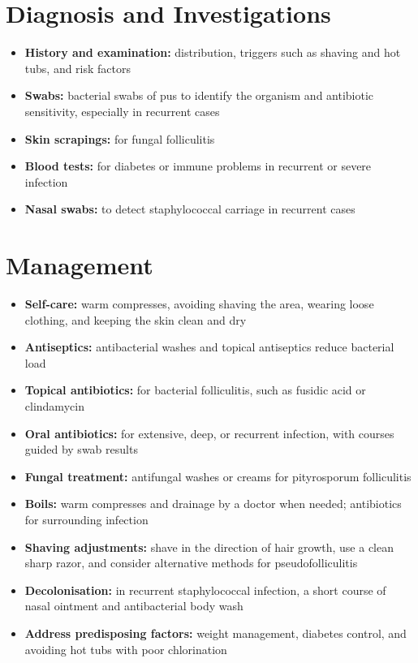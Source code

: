 \section*{Diagnosis and Investigations}
\begin{itemize}
    \item \textbf{History and examination:} distribution, triggers such as shaving and hot tubs, and risk factors
    \item \textbf{Swabs:} bacterial swabs of pus to identify the organism and antibiotic sensitivity, especially in recurrent cases
    \item \textbf{Skin scrapings:} for fungal folliculitis
    \item \textbf{Blood tests:} for diabetes or immune problems in recurrent or severe infection
    \item \textbf{Nasal swabs:} to detect staphylococcal carriage in recurrent cases
\end{itemize}

\section*{Management}
\begin{itemize}
    \item \textbf{Self-care:} warm compresses, avoiding shaving the area, wearing loose clothing, and keeping the skin clean and dry
    \item \textbf{Antiseptics:} antibacterial washes and topical antiseptics reduce bacterial load
    \item \textbf{Topical antibiotics:} for bacterial folliculitis, such as fusidic acid or clindamycin
    \item \textbf{Oral antibiotics:} for extensive, deep, or recurrent infection, with courses guided by swab results
    \item \textbf{Fungal treatment:} antifungal washes or creams for pityrosporum folliculitis
    \item \textbf{Boils:} warm compresses and drainage by a doctor when needed; antibiotics for surrounding infection
    \item \textbf{Shaving adjustments:} shave in the direction of hair growth, use a clean sharp razor, and consider alternative methods for pseudofolliculitis
    \item \textbf{Decolonisation:} in recurrent staphylococcal infection, a short course of nasal ointment and antibacterial body wash
    \item \textbf{Address predisposing factors:} weight management, diabetes control, and avoiding hot tubs with poor chlorination
\end{itemize}

